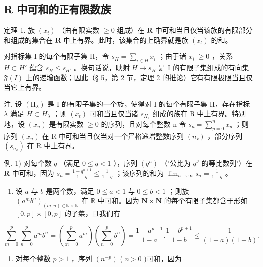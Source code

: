 \subsection{R 中可和的正有限数族}

定理 1. 族 \((x_{t})\) （由有限实数 \(\geqslant 0\) 组成）在 \(\mathbf{R}\) 中可和当且仅当该族的有限部分和组成的集合在 \(\mathbf{R}\) 中上有界。此时，该集合的上确界就是族 \((x_{t})\) 的和。

对指标集 I 的每个有限子集 H，令 \(s_{H} = \sum_{i \in H} x_{i}\) ；由于诸 \(x_{i}\) \(\geqslant 0\) ，关系 \(H \subset H'\) 蕴含 \(s_{H} \leqslant s_{H'}\) 。换句话说，映射 \(H \to s_{H}\) 是 I 的有限子集组成的有向集 \(\mathfrak{F}(I)\) 上的递增函数；因此（§ 5，第 2 节，定理 2 的推论）它有有限极限当且仅当它上有界。

注. 设 \((\mathrm{H}_{\lambda})\) 是 I 的有限子集的一个族，使得对 I 的每个有限子集 H，存在指标 \(\lambda\) 满足 \(H \subset H_{\lambda}\) ；则 \((x_{t})\) 可和当且仅当诸 \(s_{H_{1}}\) 组成的族在 R 中上有界。特别地，设 \((x_{n})\) 是有限实数 \(\geqslant 0\) 的序列，且对每个整数 n 令 \(s_{n} = \sum_{p=0}^{n} x_{p}\) ；则序列 \((x_{n})\) 在 R 中可和当且仅当对一个严格递增整数序列 \((n_{k})\) ，部分序列 \((s_{n_{k}})\) 在 R 中上有界。

例. 1) 对每个数 \(q\) （满足 \(0 \leqslant q < 1\) ），序列 \((q^n)\) （'公比为 \(q''\) 的等比数列'）在 \(\mathbf{R}\) 中可和，因为 \(s_n = \frac{1 - q^{n+1}}{1 - q} \leqslant \frac{1}{1 - q}\) ；该序列的和为 \(\lim_{n \to \infty} s_n = \frac{1}{1 - q}\) 。

\begin{enumerate}
\def\labelenumi{\arabic{enumi})}
\setcounter{enumi}{1}
\tightlist
\item
  设 \(a\) 与 \(b\) 是两个数，满足 \(0 \leqslant a < 1\) 与 \(0 \leqslant b < 1\) ；则族 \((a^{m}b^{n})_{(m,n) \in \mathbb{N} \times \mathbb{N}}\) 在 \(\mathbb{R}\) 中可和。因为 \(\mathbf{N} \times \mathbf{N}\) 的每个有限子集都含于形如 \([0, p] \times [0, p]\) 的子集，且我们有
\end{enumerate}

\[
\sum_ {m = 0} ^ {p} \sum_ {n = 0} ^ {p} a ^ {m} b ^ {n} = \left(\sum_ {m = 0} ^ {p} a ^ {m}\right) \left(\sum_ {n = 0} ^ {p} b ^ {n}\right) = \frac {1 - a ^ {p + 1}}{1 - a}. \frac {1 - b ^ {p + 1}}{1 - b} \leqslant \frac {1}{(1 - a) (1 - b)}.
\]

\begin{enumerate}
\def\labelenumi{\arabic{enumi})}
\setcounter{enumi}{2}
\tightlist
\item
  对每个整数 \(p > 1\) ，序列 \((n^{-p})\) ( \(n > 0\) )可和，因为
\end{enumerate}


